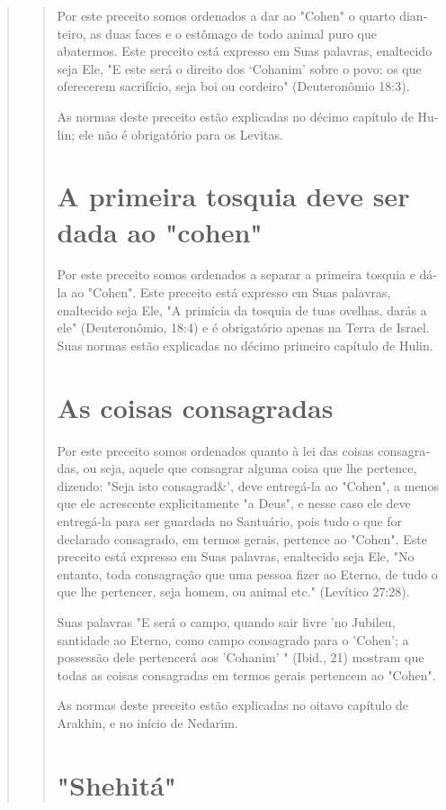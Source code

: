 \begin{quote}
\begin{quote}
Por este preceito somos ordenados a dar ao "Cohen" o quarto dian­teiro,
as duas faces e o estômago de todo animal puro que abatermos. Este
pre­ceito está expresso em Suas palavras, enaltecido seja Ele, "E este
será o direito dos `Cohanim' sobre o povo: os que oferecerem sacrifício,
seja boi ou cordei­ro" (Deuteronômio 18:3).

As normas deste preceito estão explicadas no décimo capítulo de Hu­lin;
ele não é obrigatório para os Levitas.

\section{A primeira tosquia deve ser dada ao "cohen"}

Por este preceito somos ordenados a separar a primeira tosquia e dá-la
ao "Cohen". Este preceito está expresso em Suas palavras, enaltecido
seja Ele, "A primícia da tosquia de tuas ovelhas, darás a ele"
(Deuteronômio, 18:4) e é obrigatório apenas na Terra de Israel. Suas
normas estão explicadas no décimo primeiro capítulo de Hulin.

\section{As coisas consagradas}

Por este preceito somos ordenados quanto à lei das coisas consagra­das,
ou seja, aquele que consagrar alguma coisa que lhe pertence, dizendo:
"Seja isto consagrad\&', deve entregá-la ao "Cohen", a menos que ele
acrescente ex­plicitamente "a Deus", e nesse caso ele deve entregá-la
para ser guardada no Santuário, pois tudo o que for declarado
consagrado, em termos gerais, perten­ce ao "Cohen". Este preceito está
expresso em Suas palavras, enaltecido seja Ele, "No entanto, toda
consagração que uma pessoa fizer ao Eterno, de tudo o que lhe pertencer,
seja homem, ou animal etc." (Levítico 27:28).

Suas palavras "E será o campo, quando sair livre 'no Jubileu, santida­de
ao Eterno, como campo consagrado para o 'Cohen'; a possessão dele
per­tencerá aos 'Cohanim' " (Ibid., 21) mostram que todas as coisas
consagradas em termos gerais pertencem ao "Cohen".

As normas deste preceito estão explicadas no oitavo capítulo de
Arak­hin, e no início de Nedarim.

\section{"Shehitá"}


\end{quote}
\end{quote}

